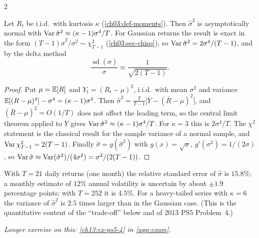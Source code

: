\begin{paracol}{2}
\begin{proposition}\label{ch13:prop-precision}
Let $R_t$ be i.i.d.\ with kurtosis $\kappa$ (\cref{ch03:def-moments}). Then $\hat\sigma^2$ is asymptotically normal with
$\operatorname{Var}\hat\sigma^2\approx(\kappa-1)\sigma^4/T$. For Gaussian returns the result is exact in the form
$(T-1)\hat\sigma^2/\sigma^2\sim\chi^2_{T-1}$ (\cref{ch03:sec-chisq}), so $\operatorname{Var}\hat\sigma^2=2\sigma^4/(T-1)$, and by the delta method
\[
  \frac{\operatorname{sd}(\hat\sigma)}{\sigma}\approx\frac1{\sqrt{2(T-1)}} .
\]
\end{proposition}
\begin{proof}
Put $\mu=\mathbb{E}[R]$ and $Y_t=(R_t-\mu)^2$, i.i.d.\ with mean $\sigma^2$ and variance $\mathbb{E}[(R-\mu)^4]-\sigma^4=(\kappa-1)\sigma^4$.
Then $\hat\sigma^2=\frac{T}{T-1}\bigl[\overline Y-(\bar R-\mu)^2\bigr]$, and $(\bar R-\mu)^2=O(1/T)$ does not affect the leading term, so
the central limit theorem applied to $\overline Y$ gives $\operatorname{Var}\hat\sigma^2\approx(\kappa-1)\sigma^4/T$. For $\kappa=3$ this is $2\sigma^4/T$.
The $\chi^2$ statement is the classical result for the sample variance of a normal sample, and $\operatorname{Var}\chi^2_{T-1}=2(T-1)$. Finally
$\hat\sigma=g(\hat\sigma^2)$ with $g(x)=\sqrt x$, $g'(\sigma^2)=1/(2\sigma)$, so $\operatorname{Var}\hat\sigma\approx\operatorname{Var}(\hat\sigma^2)/(4\sigma^2)=\sigma^2/(2(T-1))$.
\end{proof}
With $T=21$ daily returns (one month) the relative standard error of $\hat\sigma$ is $15.8\%$: a monthly estimate
of $12\%$ annual volatility is uncertain by about $\pm1.9$ percentage points; with $T=252$ it is $4.5\%$. For a
heavy-tailed series with $\kappa=6$ the variance of $\hat\sigma^2$ is $2.5$ times larger than in the Gaussian case.
(This is the quantitative content of the ``trade-off'' below and of 2013 PS5 Problem~4.)

\noindent\emph{Longer exercise on this: \cref{ch13:ex-ps5-4} in \cref{app:exam}.}


\end{paracol}
